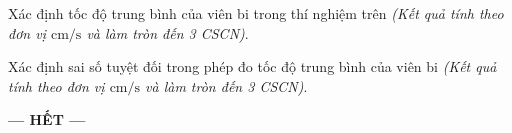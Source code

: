 \begin{ex}
	Xác định tốc độ trung bình của viên bi trong thí nghiệm trên \textit{(Kết quả tính theo đơn vị $\si{\centi\meter/\second}$ và làm tròn đến 3 CSCN)}.
\end{ex}
\begin{ex}
	Xác định sai số tuyệt đối trong phép đo tốc độ trung bình của viên bi \textit{(Kết quả tính theo đơn vị $\si{\centi\meter/\second}$ và làm tròn đến 3 CSCN)}.
\end{ex}
\begin{center}
	\textbf{--- HẾT ---}
\end{center}